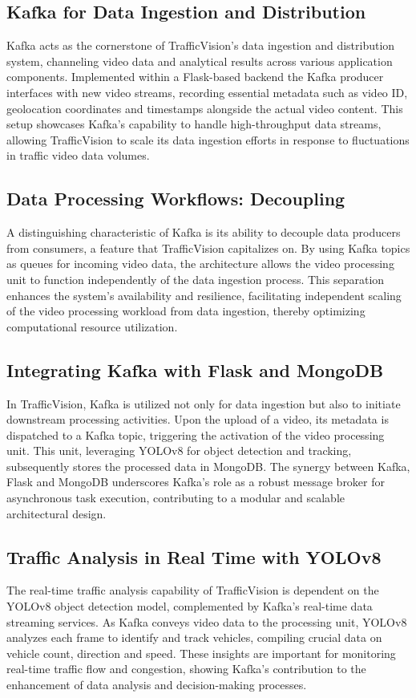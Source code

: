 \subsection{Kafka for Data Ingestion and Distribution}
Kafka acts as the cornerstone of TrafficVision's data ingestion and distribution system, channeling video data and analytical results across various application components. Implemented within a Flask-based backend the Kafka producer interfaces with new video streams, recording essential metadata such as video ID, geolocation coordinates and timestamps alongside the actual video content. This setup showcases Kafka's capability to handle high-throughput data streams, allowing TrafficVision to scale its data ingestion efforts in response to fluctuations in traffic video data volumes.

\subsection{Data Processing Workflows: Decoupling}
A distinguishing characteristic of Kafka is its ability to decouple data producers from consumers, a feature that TrafficVision capitalizes on. By using Kafka topics as queues for incoming video data, the architecture allows the video processing unit to function independently of the data ingestion process. This separation enhances the system's availability and resilience, facilitating independent scaling of the video processing workload from data ingestion, thereby optimizing computational resource utilization.

\subsection{Integrating Kafka with Flask and MongoDB}
In TrafficVision, Kafka is utilized not only for data ingestion but also to initiate downstream processing activities. Upon the upload of a video, its metadata is dispatched to a Kafka topic, triggering the activation of the video processing unit. This unit, leveraging YOLOv8 for object detection and tracking, subsequently stores the processed data in MongoDB. The synergy between Kafka, Flask and MongoDB underscores Kafka's role as a robust message broker for asynchronous task execution, contributing to a modular and scalable architectural design.

\subsection{Traffic Analysis in Real Time with YOLOv8}
The real-time traffic analysis capability of TrafficVision is dependent on the YOLOv8 object detection model, complemented by Kafka's real-time data streaming services. As Kafka conveys video data to the processing unit, YOLOv8 analyzes each frame to identify and track vehicles, compiling crucial data on vehicle count, direction and speed. These insights are important for monitoring real-time traffic flow and congestion, showing Kafka's contribution to the enhancement of data analysis and decision-making processes.

